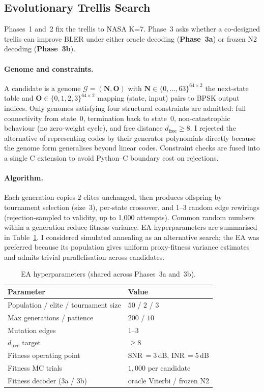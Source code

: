 \documentclass[conference]{IEEEtran}
\newcommand{\dfree}{d_{\mathrm{free}}}
\begin{document}
\subsection{Evolutionary Trellis Search}
\label{sec:ea}

Phases~1 and~2 fix the trellis to NASA K=7.  Phase~3 asks whether a
co-designed trellis can improve BLER under either oracle decoding
(\textbf{Phase~3a}) or frozen N2 decoding (\textbf{Phase~3b}).

\paragraph*{Genome and constraints.}
A candidate is a genome $\mathcal{G} = (\mathbf{N},\mathbf{O})$ with
$\mathbf{N} \in \{0,\ldots,63\}^{64\times 2}$ the next-state table and
$\mathbf{O} \in \{0,1,2,3\}^{64\times 2}$ mapping (state, input) pairs to
BPSK output indices.  Only genomes satisfying four structural constraints
are admitted: full connectivity from state~0, termination back to
state~0, non-catastrophic behaviour (no zero-weight cycle), and free
distance $\dfree \geq 8$.  I rejected the alternative of representing
codes by their generator polynomials directly because the genome form
generalises beyond linear codes.  Constraint checks are fused into a
single C extension to avoid Python--C boundary cost on rejections.

\paragraph*{Algorithm.}
Each generation copies $2$ elites unchanged, then produces offspring by
tournament selection (size~$3$), per-state crossover, and 1--3 random
edge rewirings (rejection-sampled to validity, up to 1{,}000 attempts).
Common random numbers within a generation reduce fitness variance.
EA hyperparameters are summarised in Table~\ref{tab:ea_params}.
I considered simulated annealing as an alternative search; the EA was
preferred because its population gives uniform proxy-fitness variance
estimates and admits trivial parallelisation across candidates.

\begin{table}[t]
  \centering
  \caption{EA hyperparameters (shared across Phases~3a and~3b).}
  \label{tab:ea_params}
  \small
  \begin{tabular}{ll}
    \toprule
    Parameter & Value \\
    \midrule
    Population / elite / tournament size & $50$ / $2$ / $3$ \\
    Max generations / patience & $200$ / $10$ \\
    Mutation edges & $1$--$3$ \\
    $\dfree$ target & $\geq 8$ \\
    Fitness operating point & SNR\,$=3$\,dB, INR\,$=5$\,dB \\
    Fitness MC trials & $1{,}000$ per candidate \\
    Fitness decoder (3a / 3b) & oracle Viterbi / frozen N2 \\
    \bottomrule
  \end{tabular}
\end{table}
\end{document}
